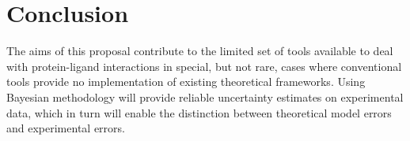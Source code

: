 \documentclass[10pt,final]{article}
\begin{document}
\section*{Conclusion}
The aims of this proposal contribute to the limited set of tools available to deal with protein-ligand interactions in special, but not rare, cases where conventional tools provide no implementation of existing theoretical frameworks. Using Bayesian methodology will provide reliable uncertainty estimates on experimental data, which in turn will enable the distinction between theoretical model errors and experimental errors.

\setlength{\emergencystretch}{1em}
\printbibliography
\end{document}
